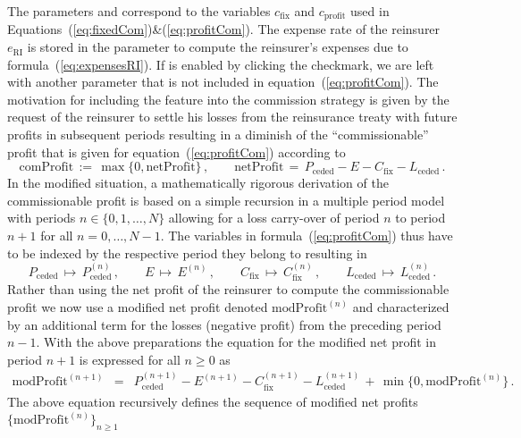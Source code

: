 The parameters  and  correspond to the
variables $c_{\mathrm{fix}}$ and $c_{\mathrm{profit}}$ used in
Equations~(\ref{eq:fixedCom})\&(\ref{eq:profitCom}).
The expense rate of the reinsurer $e_{\mathrm{RI}}$ is stored in the
parameter  to compute
the reinsurer's expenses due to formula~(\ref{eq:expensesRI}).
If  is enabled by clicking the
checkmark, we are left with another parameter
 that is not included in equation~(\ref{eq:profitCom}).
The motivation for including the feature  into the commission strategy
is given by the request of the reinsurer to settle his losses from
the reinsurance treaty with future profits in subsequent periods resulting in a
diminish of the ``commissionable'' profit that is given for equation~(\ref{eq:profitCom})
according to
\begin{equation}\label{def:comProfit}
 \mathrm{comProfit}\,:=\,\max\big\{0,\mathrm{netProfit}\big\}\,,\quad
\quad \mathrm{netProfit}\,=\,P_{\mathrm{ceded}}-E-C_{\mathrm{fix}}-L_{\mathrm{ceded}}\,.
\end{equation}
In the modified situation, a mathematically rigorous derivation of the
commissionable profit is based on a simple recursion in a
multiple period model with periods $n\in\{0,1,\ldots,N\}$ allowing for a
loss carry-over of period $n$ to period $n+1$ for all $n=0,\ldots,N-1$.
The variables in formula~(\ref{eq:profitCom}) thus have to be indexed by the
respective period they belong to
resulting in
\[ P_{\mathrm{ceded}}\,\mapsto\, P_{\mathrm{ceded}}^{(n)}\,,
\qquad E\,\mapsto\, E^{(n)} \,,
\qquad C_{\mathrm{fix}}\,\mapsto\, C_{\mathrm{fix}}^{(n)} \,,
\qquad L_{\mathrm{ceded}}\,\mapsto\, L_{\mathrm{ceded}}^{(n)}\,.\]
Rather than using the net profit of the reinsurer to compute the commissionable 
profit we now use a modified net profit
denoted $\mathrm{modProfit}^{(n)}$ and characterized by an
additional term for the losses (negative profit) from the preceding period $n-1$.
With the above preparations the equation for the modified net profit in period $n+1$ is expressed
for all $n\geq0$ as
\begin{eqnarray}\label{eq:recursion}
\mathrm{modProfit}^{(n+1)}& =&
P_{\mathrm{ceded}}^{(n+1)}-E^{(n+1)}-C_{\mathrm{fix}}^{(n+1)}- L_{\mathrm{ceded}}^{(n+1)}\,
+\,\min\big\{0,\mathrm{modProfit}^{(n)}\big\}\,.
\end{eqnarray}
The above equation recursively defines the sequence of modified net profits $\{\mathrm{modProfit}^{(n)}\}_{n\geq1}$

